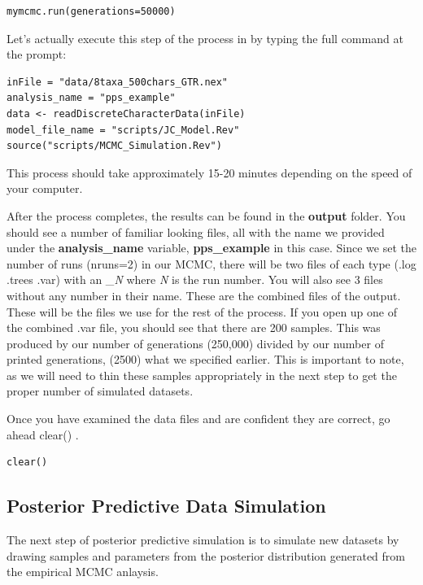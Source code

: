 {\tt \begin{snugshade*}
\begin{lstlisting}
mymcmc.run(generations=50000)
\end{lstlisting}
\end{snugshade*}}


Let's actually execute this step of the process in \RevBayes by typing the full command at the \RevBayes 
prompt: 

{\tt \begin{Snugshade}[184,207,236]
\begin{lstlisting}
inFile = "data/8taxa_500chars_GTR.nex"
analysis_name = "pps_example"
data <- readDiscreteCharacterData(inFile)
model_file_name = "scripts/JC_Model.Rev"
source("scripts/MCMC_Simulation.Rev")
\end{lstlisting}
\end{Snugshade}}

This process should take approximately 15-20 minutes depending on the speed of your computer.

After the process completes, the results can be found in the \textbf{output} folder. You should see a 
number of familiar looking files, all with the name we provided under the \textbf{analysis\_name} variable, 
\textbf{pps\_example} in this case. Since we set the number of runs (nruns=2) in our MCMC, there will be two files 
of each type (.log .trees .var) with an \_\textit{N} where \textit{N} is the run number. You will also see 3 files without 
any number in their name. These are the combined files of the output. These will be the files we use for 
the rest of the process. If you open up one of the combined .var file, you should see that there are 200 
samples. This was produced by our number of generations (250,000) divided by our number of printed generations,
(2500) what we specified earlier. This is important to note, as we will need to thin these samples 
appropriately in the next step to get the proper number of simulated datasets. 

Once you have examined the data files and are confident they are correct, go ahead clear() \RevBayes.

{\tt \begin{Snugshade}[184,207,236]
\begin{lstlisting}
clear()
\end{lstlisting}
\end{Snugshade}}

\subsection{Posterior Predictive Data Simulation}
The next step of posterior predictive simulation is to simulate new datasets by drawing samples and 
parameters from the posterior distribution generated from the empirical MCMC anlaysis. 


